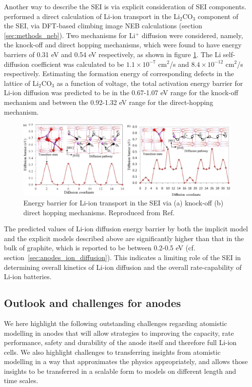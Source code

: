 \documentclass[../main.tex]{subfiles}
\begin{document}
Another way to describe the SEI is via explicit consideration of SEI components. \citeauthor{Shi2012} performed a direct calculation of Li-ion transport in the Li$_2$CO$_3$ component of the SEI,\cite{Shi2012} via DFT-based climbing image NEB calculations (section \ref{sec:methods_neb}). Two mechanisms for Li$^+$ diffusion were considered, namely, the knock-off and direct hopping mechanisms, which were found to have energy barriers of 0.31 eV and 0.54 eV respectively, as shown in figure \ref{fig:sei}. The Li self-diffusion coefficient was calculated to be $1.1\times10^{-7}$ cm$^2$/s and $8.4\times10^{-12}$ cm$^2$/s respectively. Estimating the formation energy of corresponding defects in the lattice of Li$_2$CO$_3$ as a function of voltage, the total activation energy barrier for Li-ion diffusion was predicted to be in the 0.67-1.07 eV range for the knock-off mechanism and between the 0.92-1.32 eV range for the direct-hopping mechanism.
\begin{figure}
    \centering
    \includegraphics[scale=0.5]{figures/sei.jpg}
    \caption{Energy barrier for Li-ion transport in the SEI via (a) knock-off (b) direct hopping mechanisms. Reproduced from Ref.~}
    \label{fig:sei}
\end{figure}

The predicted values of Li-ion diffusion energy barrier by both the implicit model and the explicit models described above are significantly higher than that in the bulk of graphite, which is reported to be between 0.2-0.5 eV (cf. section~\ref{sec:anodes_ion_diffusion}).\cite{thinius2014theoretical, thinius2014theoretical, Hakim, persson2010} This indicates a limiting role of the SEI in determining overall kinetics of Li-ion diffusion and the overall rate-capability of Li-ion batteries.

\subsection{Outlook and challenges for anodes}

We here highlight the following outstanding challenges regarding atomistic modelling in anodes that will allow strategies to improving the capacity, rate performance, safety and durability of the anode itself and therefore full Li-ion cells. We also highlight challenges to transferring insights from atomistic modelling in a way that approximates the physics appropriately, and allows those insights to be transferred in a scalable form to models on different length and time scales.
\end{document}
